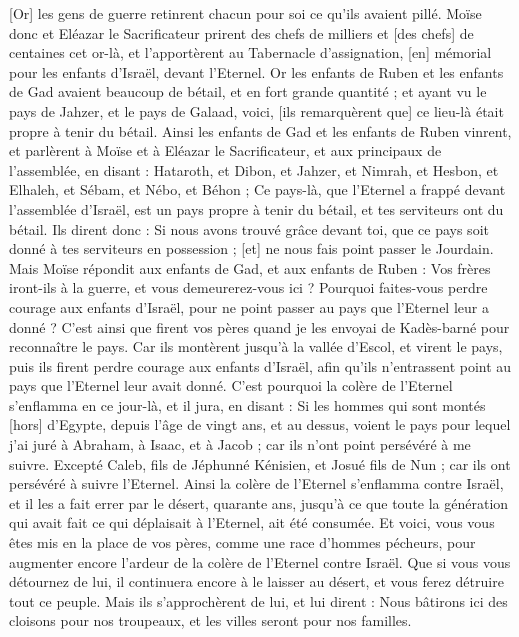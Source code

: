 \begin{multicols}{2}
[Or] les gens de guerre retinrent chacun pour soi ce qu'ils avaient pillé.
Moïse donc et Eléazar le Sacrificateur prirent des chefs de milliers et [des chefs] de centaines cet or-là, et l'apportèrent au Tabernacle d'assignation, [en] mémorial pour les enfants d'Israël, devant l'Eternel.
\VerseOne{}Or les enfants de Ruben et les enfants de Gad avaient beaucoup de bétail, et en fort grande quantité ; et ayant vu le pays de Jahzer, et le pays de Galaad, voici, [ils remarquèrent que] ce lieu-là était propre à tenir du bétail.
Ainsi les enfants de Gad et les enfants de Ruben vinrent, et parlèrent à Moïse et à Eléazar le Sacrificateur, et aux principaux de l'assemblée, en disant :
Hataroth, et Dibon, et Jahzer, et Nimrah, et Hesbon, et Elhaleh, et Sébam, et Nébo, et Béhon ;
Ce pays-là, que l'Eternel a frappé devant l'assemblée d'Israël, est un pays propre à tenir du bétail, et tes serviteurs ont du bétail.
Ils dirent donc : Si nous avons trouvé grâce devant toi, que ce pays soit donné à tes serviteurs en possession ; [et] ne nous fais point passer le Jourdain.
Mais Moïse répondit aux enfants de Gad, et aux enfants de Ruben : Vos frères iront-ils à la guerre, et vous demeurerez-vous ici ?
Pourquoi faites-vous perdre courage aux enfants d'Israël, pour ne point passer au pays que l'Eternel leur a donné ?
C'est ainsi que firent vos pères quand je les envoyai de Kadès-barné pour reconnaître le pays.
Car ils montèrent jusqu'à la vallée d'Escol, et virent le pays, puis ils firent perdre courage aux enfants d'Israël, afin qu'ils n'entrassent point au pays que l'Eternel leur avait donné.
C'est pourquoi la colère de l'Eternel s'enflamma en ce jour-là, et il jura, en disant :
Si les hommes qui sont montés [hors] d'Egypte, depuis l'âge de vingt ans, et au dessus, voient le pays pour lequel j'ai juré à Abraham, à Isaac, et à Jacob ; car ils n'ont point persévéré à me suivre.
Excepté Caleb, fils de Jéphunné Kénisien, et Josué fils de Nun ; car ils ont persévéré à suivre l'Eternel.
Ainsi la colère de l'Eternel s'enflamma contre Israël, et il les a fait errer par le désert, quarante ans, jusqu'à ce que toute la génération qui avait fait ce qui déplaisait à l'Eternel, ait été consumée.
Et voici, vous vous êtes mis en la place de vos pères, comme une race d'hommes pécheurs, pour augmenter encore l'ardeur de la colère de l'Eternel contre Israël.
Que si vous vous détournez de lui, il continuera encore à le laisser au désert, et vous ferez détruire tout ce peuple.
Mais ils s'approchèrent de lui, et lui dirent : Nous bâtirons ici des cloisons pour nos troupeaux, et les villes seront pour nos familles.

\end{multicols}
